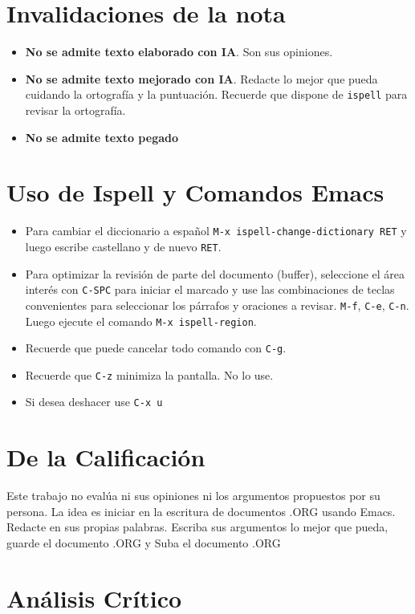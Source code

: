 \documentclass{article}
\begin{document}
\section{Invalidaciones de la nota}
\label{sec:orgb1e414f}
\begin{itemize}
\item \textbf{\textbf{No se admite texto elaborado con IA}}. Son sus opiniones.
\item \textbf{\textbf{No se admite texto mejorado con IA}}. Redacte lo mejor que pueda
cuidando la ortografía y la puntuación. Recuerde que dispone de
\texttt{ispell} para revisar la ortografía.
\item \textbf{\textbf{No se admite texto pegado}}
\end{itemize}
\section{Uso de Ispell y Comandos Emacs}
\label{sec:org8e1dff8}
\begin{itemize}
\item Para cambiar el diccionario a español \texttt{M-x
  ispell-change-dictionary RET} y luego escribe castellano y de
nuevo \texttt{RET}.
\item Para optimizar la revisión de parte del documento (buffer),
seleccione el área interés con \texttt{C-SPC} para iniciar el marcado y
use las combinaciones de teclas convenientes para seleccionar los
párrafos y oraciones a revisar. \texttt{M-f}, \texttt{C-e}, \texttt{C-n}. Luego ejecute
el comando \texttt{M-x ispell-region}.
\item Recuerde que puede cancelar todo comando con \texttt{C-g}.
\item Recuerde que \texttt{C-z} minimiza la pantalla. No lo use.
\item Si desea deshacer use \texttt{C-x u}
\end{itemize}
\section{De la Calificación}
\label{sec:org2f2390c}
Este trabajo no evalúa ni sus opiniones ni los argumentos propuestos
por su persona. La idea es iniciar en la escritura de documentos .ORG
usando Emacs. Redacte en sus propias palabras.
Escriba sus argumentos lo mejor que pueda, guarde el documento .ORG y
Suba el documento .ORG
\section{Análisis Crítico}
\label{sec:org19d2ffe}
\end{document}
